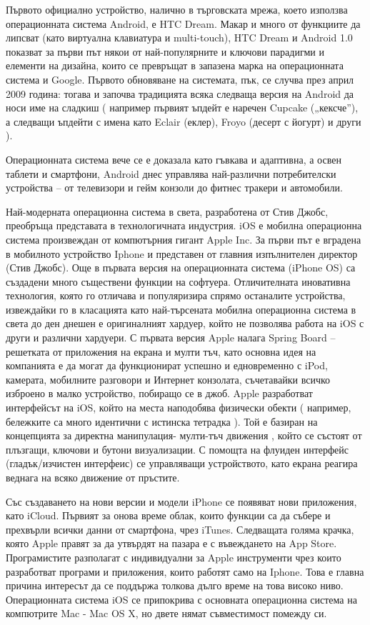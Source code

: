 Първото официално устройство, налично в търговската мрежа, което използва операционната система Android, е HTC Dream. Макар и много от функциите да липсват (като виртуална клавиатура и multi-touch), HTC Dream и Android 1.0 показват за първи път някои от най-популярните и ключови парадигми и елементи на дизайна, които се превръщат в запазена марка на операционната система и Google. Първото обновяване на системата, пък, се случва през април 2009 година: тогава и започва традицията всяка следваща версия на Android да носи име на сладкиш ( например първият ъпдейт е наречен Cupcake („кексче”), а следващи ъпдейти с имена като Eclair (еклер), Froyo (десерт с йогурт) и други ).

Операционната система вече се е доказала като гъвкава и адаптивна, а освен таблети и смартфони, Android днес управлява най-различни потребителски устройства – от телевизори и гейм конзоли до фитнес тракери и автомобили. 

Най-модерната операционна система в света, разработена от Стив Джобс, преобръща представата в технологичната индустрия. iOS е мобилна операционна система произвеждан от компютърния гигант Apple Inc. За първи път е вградена в мобилното устройство Iphone и представен от главния изпълнителен директор (Стив Джобс). Още в първата версия на операционната система (iPhone OS) са създадени много съществени функции  на софтуера. Отличителната иновативна технология, която го отличава и популяризира спрямо останалите устройства, извеждайки го в класацията като най-търсената мобилна операционна система в света до ден днешен е оригиналният хардуер, който не позволява работа на iOS с други и различни хардуери. С първата версия Apple налага Spring Board – решетката от приложения на екрана и мулти тъч, като основна идея на компанията е да могат да функционират успешно и едновременно с iPod, камерата, мобилните разговори и Интернет конзолата, съчетавайки всичко изброено в малко устройство, побиращо се в джоб. Apple разработват интерфейсът на iOS, който на места наподобява физически обекти ( например, бележките са много идентични с истинска тетрадка ). Той е базиран на концепцията за директна манипулация- мулти-тъч движения , който се състоят от плъзгащи, ключови и бутони визуализации. С помощта на флуиден интерфейс (гладък/изчистен интерфеис) се управляващи устройството, като екрана реагира веднага на всяко  движение от пръстите. 

Със създаването на нови версии и модели iPhone се появяват нови приложения, като iCloud. Първият за онова време облак, които функции са да събере и прехвърли всички данни от смартфона,  чрез iTunes. Следващата голяма крачка, която Apple правят за да утвърдят на пазара е с въвеждането на App Store. Програмистите разполагат с индивидуални за Apple инструменти чрез които разработват програми и приложения, които работят само на Iphone. Това е главна причина интересът да се поддържа толкова дълго време на това високо ниво. Операционната система iOS се припокрива с основната операционна система на компютрите Mac - Mac OS X, но двете нямат съвместимост помежду си.

